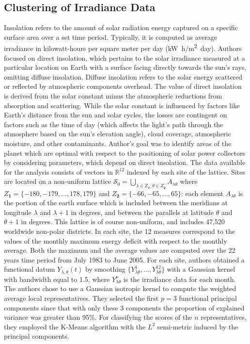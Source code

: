 \subsection{Clustering of Irradiance Data}
\label{subsec:irradiance}
Insolation refers to the amount of solar radiation energy captured on a specific surface area over a set time period. Typically, it is computed as average irradiance in kilowatt-hours per square meter per day (\unit{\kilo\watt.h/\metre^2.day}). Authors focused on direct insolation, which pertains to the solar irradiance measured at a particular location on Earth with a surface facing directly towards the sun's rays, omitting diffuse insolation. Diffuse insolation refers to the solar energy scattered or reflected by atmospheric components overhead. The value of direct insolation is derived from the solar constant minus the atmospheric reductions from absorption and scattering. While the solar constant is influenced by factors like Earth's distance from the sun and solar cycles, the losses are contingent on factors such as the time of day (which affects the light's path through the atmosphere based on the sun's elevation angle), cloud coverage, atmospheric moisture, and other contaminants. Author's goal was to identify areas of the planet which are optimal with respect to the positioning of solar power collectors by considering parameters, which depend on direct insolation. The data available for the analysis consists of vectors in $\mathbb{R}^{12}$ indexed by each site of the lattice. Sites are located on a non-uniform lattice $\mathcal{S}_0=\bigcup_{\lambda \in Z_{\mathbf{1}};\theta \in Z_{\mathbf{2}}}A_{\lambda\theta}$ where $Z_{\mathbf{1}} = \{ -180, -179, \dots, 178, 179\}$ and $Z_{\mathbf{2}} = \{ -66, -65, \dots, 65\}$: each element $A_{\lambda\theta}$ is the portion of the earth surface which is included between the meridians at longitude $\lambda$ and $\lambda + 1$ in degrees, and between the parallels at latitude $\theta$ and $\theta + 1$ in degrees. This lattice is of course non-uniform, and includes 47,520 worldwide non-polar districts. In each site, the 12 measures correspond to the values of the monthly maximum energy deficit with respect to the monthly average. Both the maximum and the average values are computed over the 22 years time period from July 1983 to June 2005. For each site, authors obtained a functional datum $Y_{\lambda,\theta}(t)$ by smoothing $\{Y_{\lambda\theta}^1, \dots, Y_{\lambda\theta}^12\}$ with a Gaussian kernel with bandwidth equal to 1.5, where $Y_{\lambda\theta}^\nu$ is the irradiance data for each month. The authors chose to use a Gaussian isotropic kernel to compute the weighted average local representatives. They selected the first $p=3$ functional principal components since that with only these 3 components the proportion of explained variance was greater than 95\%. For classifying the scores of the $n$ representatives, they employed the K-Means algorithm with the $L^2$ semi-metric induced by the principal components.
